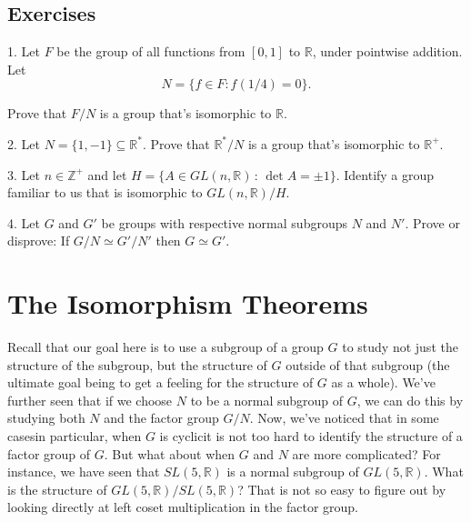 \documentclass[10pt,]{book}
\theoremstyle{plain}
\theoremstyle{definition}
\theoremstyle{definition}
\theoremstyle{definition}
\theoremstyle{definition}
\numberwithin{equation}{section}
\def\Z{\mathbb{Z}}
\def\R{\mathbb{R}}
\begin{document}
\section[{Exercises}]{Exercises}\label{exercises-9}
\begin{exerciselist}
\item[1.]\hypertarget{exercise-59}{}Let \(F\) be the group of all functions from \([0,1]\) to \(\R\), under pointwise addition. Let%
\begin{equation*}
N=\{f\in F:
f(1/4)=0\}.
\end{equation*}
%
\par
Prove that \(F/N\) is a group that's isomorphic to \(\R\).%
\par\smallskip
\item[2.]\hypertarget{exercise-60}{}Let \(N=\{1,-1\}\subseteq \R^*\). Prove that \(\R^*/N\) is a group that's isomorphic to \(\R^+\).%
\par\smallskip
\item[3.]\hypertarget{exercise-61}{}Let \(n\in \Z^+\) and let \(H=\{A\in GL(n,\R)\,:\, \det A =\pm
1\}\). Identify a group familiar to us that is isomorphic to \(GL(n,\R)/H\).%
\par\smallskip
\item[4.]\hypertarget{exercise-62}{}Let \(G\) and \(G'\) be groups with respective normal subgroups \(N\) and \(N'\). Prove or disprove: If \(G/N\simeq G'/N'\) then \(G\simeq
G'\).%
\par\smallskip
\end{exerciselist}
\typeout{************************************************}
\typeout{************************************************}
\chapter[{The Isomorphism Theorems}]{The Isomorphism Theorems}\label{isothms}
Recall that our goal here is to use a subgroup of a group \(G\) to study not just the structure of the subgroup, but the structure of \(G\) outside of that subgroup (the ultimate goal being to get a feeling for the structure of \(G\) as a whole). We've further seen that if we choose \(N\) to be a normal subgroup of \(G\), we can do this by studying both \(N\) and the factor group \(G/N\). Now, we've noticed that in some cases\textemdash{}in particular, when \(G\) is cyclic\textendash{}it is not too hard to identify the structure of a factor group of \(G\). But what about when \(G\) and \(N\) are more complicated? For instance, we have seen that \(SL(5,\R)\) is a normal subgroup of \(GL(5,\R)\). What is the structure of \(GL(5,\R)/SL(5,\R)\)? That is not so easy to figure out by looking directly at left coset multiplication in the factor group.%
\typeout{************************************************}
\typeout{************************************************}
\end{document}
